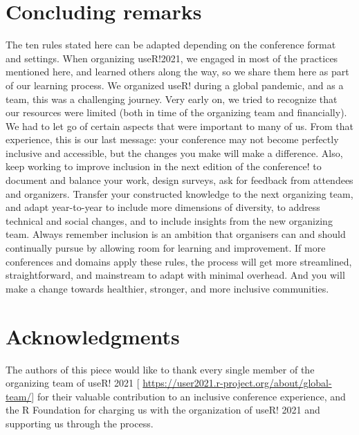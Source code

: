 \documentclass[10pt,letterpaper]{article}
\begin{document}
\section*{Concluding remarks}

The ten rules stated here can be adapted depending on the conference format and settings.
When organizing useR!2021, we engaged in most of the practices mentioned here, and learned others along the way, so we share them here as part of our learning process. 
We organized useR! during a global pandemic, and as a team, this was a challenging journey. 
Very early on, we tried to recognize that our resources were limited (both in time of the organizing team and financially). 
We had to let go of certain aspects that were important to many of us. 
From that experience, this is our last message: your conference may not become perfectly inclusive and accessible, but the changes you make will make a difference.
Also, keep working to improve inclusion in the next edition of the conference! to document and balance your work, design surveys, ask for feedback from attendees and organizers. Transfer your constructed knowledge to the next organizing team, and adapt year-to-year to include more dimensions of diversity, to address technical and social changes, and to include insights from the new organizing team. Always remember inclusion is an ambition that organisers can and should continually pursue by allowing room for learning and improvement.
If more conferences and domains apply these rules, the process will get more streamlined, straightforward, and mainstream to adapt with minimal overhead.
And you will make a change towards healthier, stronger, and more inclusive communities.




\section*{Acknowledgments}
The authors of this piece would like to thank every single member of the organizing team of useR! 2021 [ \url{https://user2021.r-project.org/about/global-team/}] for their valuable contribution to an inclusive conference experience, and the R Foundation for charging us with the organization of useR! 2021 and supporting us through the process. 




\end{document}
